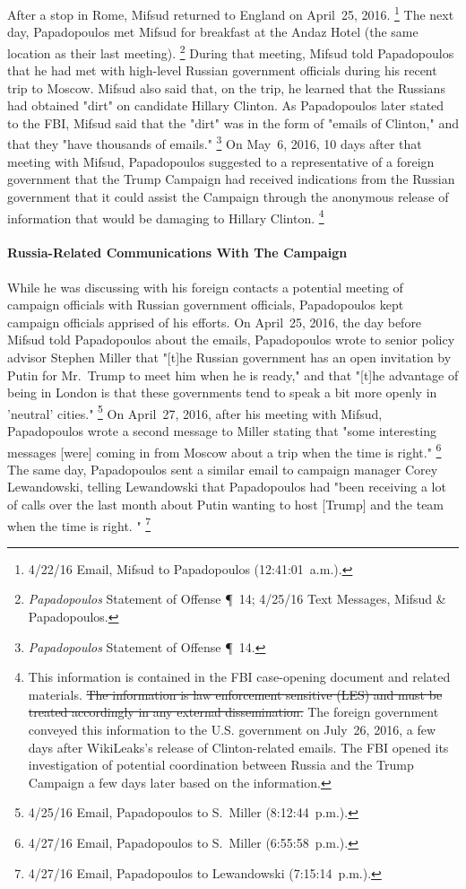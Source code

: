 After a stop in Rome, Mifsud returned to England on April~25, 2016.%
\footnote{4/22/16 Email, Mifsud to Papadopoulos (12:41:01~a.m.).}
The next day, Papadopoulos met Mifsud for breakfast at the Andaz Hotel (the same location as their last meeting).%
\footnote{\textit{Papadopoulos} Statement of Offense \P~14;
4/25/16 Text Messages, Mifsud \& Papadopoulos.}
During that meeting, Mifsud told Papadopoulos that he had met with high-level Russian government officials during his recent trip to Moscow.
Mifsud also said that, on the trip, he learned that the Russians had obtained "dirt" on candidate Hillary Clinton.
As Papadopoulos later stated to the FBI, Mifsud said that the "dirt" was in the form of "emails of Clinton," and that they "have thousands of emails."%
\footnote{\textit{Papadopoulos} Statement of Offense \P~14.}
On May~6, 2016, 10 days after that meeting with Mifsud, Papadopoulos suggested to a representative of a foreign government that the Trump Campaign had received indications from the Russian government that it could assist the Campaign through the anonymous release of information that would be damaging to Hillary Clinton.%
\footnote{\label{fnFourSixFive}This information is contained in the FBI case-opening document and related materials.
\sout{The information is law enforcement sensitive (LES) and must be treated accordingly in any external dissemination.}
The foreign government conveyed this information to the U.S. government on July~26, 2016, a few days after WikiLeaks's release of Clinton-related emails.
The FBI opened its investigation of potential coordination between Russia and the Trump Campaign a few days later based on the information.}

\paragraph{Russia-Related Communications With The Campaign}

While he was discussing with his foreign contacts a potential meeting of campaign officials with Russian government officials, Papadopoulos kept campaign officials apprised of his efforts.
On April~25, 2016, the day before Mifsud told Papadopoulos about the emails, Papadopoulos wrote to senior policy advisor Stephen Miller that "[t]he Russian government has an open invitation by Putin for Mr.~Trump to meet him when he is ready," and that "[t]he advantage of being in London is that these governments tend to speak a bit more openly in 'neutral' cities."%
\footnote{4/25/16 Email, Papadopoulos to S.~Miller (8:12:44~p.m.).}
On April~27, 2016, after his meeting with Mifsud, Papadopoulos wrote a second message to Miller stating that "some interesting messages [were] coming in from Moscow about a trip when the time is right."%
\footnote{4/27/16 Email, Papadopoulos to S.~Miller (6:55:58~p.m.).}
The same day, Papadopoulos sent a similar email to campaign manager Corey Lewandowski, telling Lewandowski that Papadopoulos had "been receiving a lot of calls over the last month about Putin wanting to host [Trump] and the team when the time is right. "%
\footnote{4/27/16 Email, Papadopoulos to Lewandowski (7:15:14~p.m.).}

